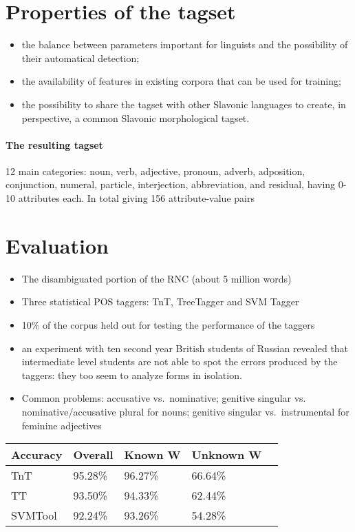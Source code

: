 \documentclass[largefonts]{sciposter}
\begin{document}
\begin{multicols}{2}
\section{Properties of the tagset}
\label{sec:properties}

\begin{itemize}
\item the balance between parameters important for linguists and the
  possibility of their automatical detection;
\item the availability of features in existing corpora that can be used
  for training;
\item the possibility to share the tagset with other Slavonic languages to
create, in perspective, a common Slavonic morphological tagset.
\end{itemize}

\paragraph{The resulting tagset} 12 main categories: noun, verb, adjective, pronoun, adverb, adposition,
conjunction, numeral, particle, interjection, abbreviation, and residual, having 0-10 attributes each. In total giving 156 attribute-value pairs

\section{Evaluation}

\begin{itemize}
\item The disambiguated portion of the RNC (about 5 million words)
\item Three statistical POS taggers: TnT, TreeTagger and SVM Tagger
\item 10\% of the corpus held out for testing the performance of the taggers
\item an experiment with ten second year British
  students of Russian revealed that intermediate level students  are not able to
spot the errors produced by the taggers: they too seem
  to analyze forms in isolation.  
\item Common problems: accusative vs.~nominative; genitive singular vs. nominative/accusative plural for nouns; genitive singular vs.~instrumental for feminine adjectives 
\end{itemize}

\begin{table}
  \begin{center}
    \begin{tabular}{lllll}
      \hline
      Accuracy & Overall & Known W & Unknown W\\
      \hline
      TnT  & 95.28\% & 96.27\% & 66.64\%\\
      TT  & 93.50\% & 94.33\% & 62.44\%\\
      SVMTool  & 92.24\% & 93.26\% & 54.28\%\\
      \hline
    \end{tabular}


\end{center}
\end{table}
\end{multicols}
\end{document}

